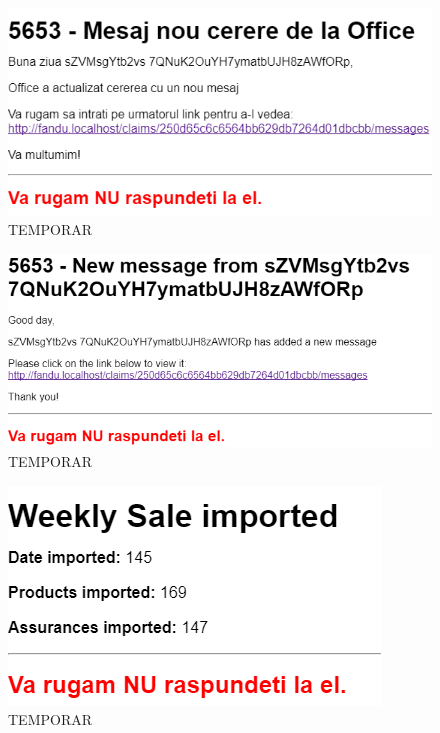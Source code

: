 	\begin{figure}
		\includegraphics[width=\linewidth]{../imagini/message_mail_from_office.png}
		\caption{TEMPORAR}
		\label{fig:TEMP}
	\end{figure}
	\begin{figure}
		\includegraphics[width=\linewidth]{../imagini/message_mail_from_person.png}
		\caption{TEMPORAR}
		\label{fig:TEMP}
	\end{figure}
	\begin{figure}
		\includegraphics[width=\linewidth]{../imagini/message_mail_weekly_import.png}
		\caption{TEMPORAR}
		\label{fig:TEMP}
	\end{figure}
